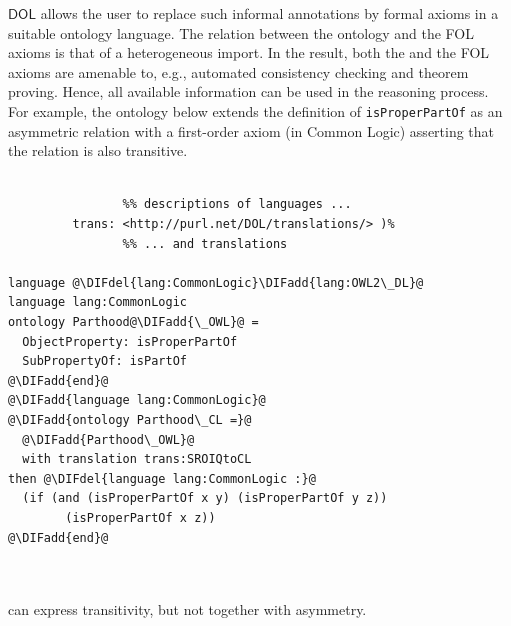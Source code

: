 \documentclass[10pt, a4paper]{isov2}
\newcommand{\bcnew}[1]{~\\{\color{red}\large \hrulefill \href{http://issues.omg.org/browse/DOL-#1}{\normalfont{JIRA DOL-{}#1}} \hrulefill\\}  }
\newcommand{\ecnew}[0]{~\\{{\color{red}\large \hrulefill {\normalfont{end}} \hrulefill\\}  }}
\newcommand*{\DOL}{\ensuremath{\mathsf{DOL}}\xspace}
\providecommand{\DIFaddtex}[1]{{\protect\color{blue}\uwave{#1}}} %
\providecommand{\DIFdeltex}[1]{{\protect\color{red}\sout{#1}}}                      %
\providecommand{\DIFadd}[1]{\texorpdfstring{\DIFaddtex{#1}}{#1}} %
\providecommand{\DIFdel}[1]{\texorpdfstring{\DIFdeltex{#1}}{}} %
\begin{document}
\DOL allows the user to replace such informal annotations by formal axioms in a suitable ontology 
language. The relation between the \OWL ontology and the FOL axioms is that of a heterogeneous 
import. In the result, both the \OWL and the FOL axioms are amenable to, e.g., automated consistency 
checking and theorem proving. Hence, all available information can be used in the reasoning process.
For example, the ontology below extends the \OWL definition of \texttt{isProperPartOf} as an asymmetric relation
with a first-order axiom (in Common Logic) asserting that the relation is also transitive.
\bcnew{38}
  \begin{lstlisting}[basicstyle=\small\ttfamily,language=dolText,alsolanguage=clif,alsolanguage=owl2Manchester,escapechar=@,mathescape]
%prefix( lang:  <http://purl.net/DOL/languages/>
                %% descriptions of languages ...
         trans: <http://purl.net/DOL/translations/> )%
                %% ... and translations

language @\DIFdel{lang:CommonLogic}\DIFadd{lang:OWL2\_DL}@
language lang:CommonLogic
ontology Parthood@\DIFadd{\_OWL}@ =
  ObjectProperty: isProperPartOf  
  SubPropertyOf: isPartOf 
@\DIFadd{end}@
@\DIFadd{language lang:CommonLogic}@
@\DIFadd{ontology Parthood\_CL =}@
  @\DIFadd{Parthood\_OWL}@
  with translation trans:SROIQtoCL
then @\DIFdel{language lang:CommonLogic :}@
  (if (and (isProperPartOf x y) (isProperPartOf y z)) 
        (isProperPartOf x z))
@\DIFadd{end}@
\end{lstlisting}
\ecnew  
\OWL can express transitivity, but not together with asymmetry.


\end{document}
